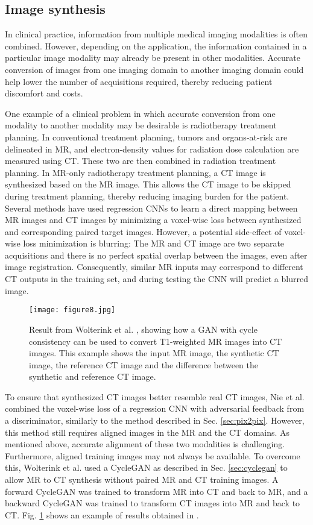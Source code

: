 \documentclass{article}
\begin{document}
\subsection{Image synthesis}
\label{sec:biomedconvert}
In clinical practice, information from multiple medical imaging modalities is often combined. However, depending on the application, the information contained in a particular image modality may already be present in other modalities. Accurate conversion of images from one imaging domain to another imaging domain could help lower the number of acquisitions required, thereby reducing patient discomfort and costs.

One example of a clinical problem in which accurate conversion from one modality to another modality may be desirable is radiotherapy treatment planning. In conventional treatment planning, tumors and organs-at-risk are delineated in MR, and electron-density values for radiation dose calculation are measured using CT. These two are then combined in radiation treatment planning. In MR-only radiotherapy treatment planning, a CT image is synthesized based on the MR image. This allows the CT image to be skipped during treatment planning, thereby reducing imaging burden for the patient. Several methods have used regression CNNs to learn a direct mapping between MR images and CT images \cite{Han17,Dink18} by minimizing a voxel-wise loss between synthesized and corresponding paired target images. However, a potential side-effect of voxel-wise loss minimization is blurring: The MR and CT image are two separate acquisitions and there is no perfect spatial overlap between the images, even after image registration. Consequently, similar MR inputs may correspond to different CT outputs in the training set, and during testing the CNN will predict a blurred image.

\begin{figure}[tp]
\centering
\texttt{[image: figure8.jpg]}
\caption{Result from Wolterink et al. \cite{Wolt17b}, showing how a GAN with cycle consistency can be used to convert T1-weighted MR images into CT images. This example shows the input MR image, the synthetic CT image, the reference CT image and the difference between the synthetic and reference CT image.}
\label{fig:cycleganresults}
\end{figure}

To ensure that synthesized CT images better resemble real CT images, Nie et al. \cite{Nie17} combined the voxel-wise loss of a regression CNN with adversarial feedback from a discriminator, similarly to the method described in Sec. \ref{sec:pix2pix}. However, this method still requires aligned images in the MR and the CT domains. As mentioned above, accurate alignment of these two modalities is challenging. Furthermore, aligned training images may not always be available. To overcome this, Wolterink et al. \cite{Wolt17b} used a CycleGAN as described in Sec. \ref{sec:cyclegan} to allow MR to CT synthesis without paired MR and CT training images. A forward CycleGAN was trained to transform MR into CT and back to MR, and a backward CycleGAN was trained to transform CT images into MR and back to CT. Fig. \ref{fig:cycleganresults} shows an example of results obtained in \cite{Wolt17b}. 
\end{document}
